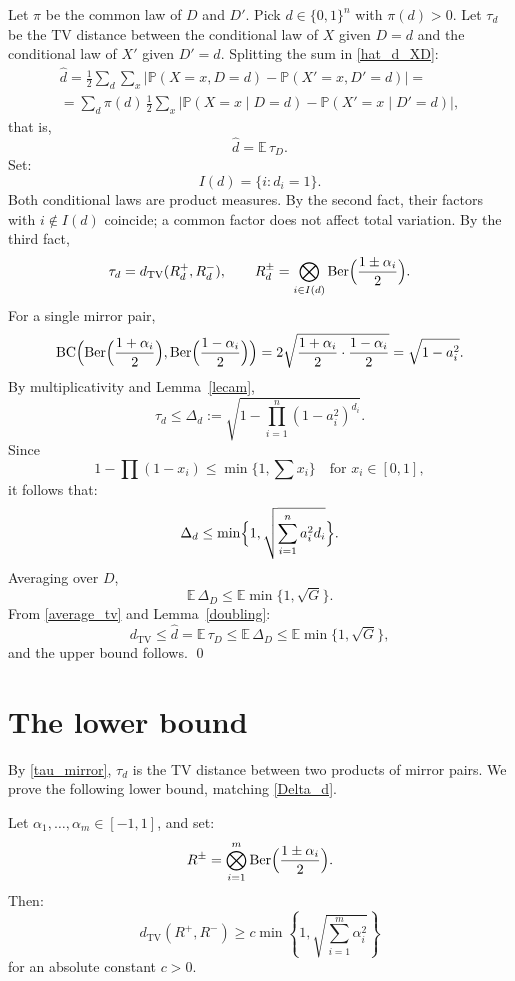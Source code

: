 \documentclass[12pt,reqno]{amsart}
\numberwithin{equation}{section}
\begin{document}
Let \(\pi\) be the common law of \(D\) and \(D'\). 
Pick \(d\in\{0,1\}^n\) with \(\pi(d)>0\). 
Let \(\tau_d\) be the TV distance
between the conditional law of \(X\) given \(D=d\) and the conditional law
of \(X'\) given \(D'=d\). Splitting the sum in \eqref{hat_d_XD}:
\begin{multline*}
\widehat d
=
\frac12\sum_d\sum_x
\bigl|\mathbb P(X=x,D=d)-\mathbb P(X'=x,D'=d)\bigr|
= \\ 
= \sum_d\pi(d)\,
\frac12\sum_x
\bigl|\mathbb P(X=x\mid D=d)-\mathbb P(X'=x\mid D'=d)\bigr|,
\end{multline*}
that is,
\begin{equation}\label{average_tv}
\widehat d=\mathbb E\,\tau_D.
\end{equation}
Set:
\[
I(d)=\{i:d_i=1\}.
\]
Both conditional laws are product measures. By the second fact, their
factors with \(i\notin I(d)\) coincide; a common factor does not affect
total variation. By the third fact,
\begin{equation}\label{tau_mirror}
\tau_d
=
d_{\mathrm{TV}}(R_d^+,R_d^-),
\qquad
R_d^\pm
=
\bigotimes_{i\in I(d)}\mathrm{Ber}\Bigl(\frac{1\pm\alpha_i}2\Bigr).
\end{equation}
For a single mirror pair,
\[
\mathrm{BC}\Bigl(
\mathrm{Ber}\Bigl(\frac{1+\alpha_i}2\Bigr),
\mathrm{Ber}\Bigl(\frac{1-\alpha_i}2\Bigr)
\Bigr)
=
2\sqrt{\frac{1+\alpha_i}2\cdot\frac{1-\alpha_i}2}
=
\sqrt{1-a_i^2}.
\]
By multiplicativity and Lemma~\ref{lecam},
\begin{equation}\label{Delta_d}
\tau_d
\le
\Delta_d
:=
\sqrt{1-\prod_{i=1}^n(1-a_i^2)^{d_i}}.
\end{equation}
Since 
\[
1-\prod(1-x_i)\le\min\{1,\sum x_i\}\quad 
\text{for \(x_i\in[0,1]\)},
\]
it follows that:
\[
\Delta_d
\le
\min\Bigl\{1,\sqrt{\sum_{i=1}^na_i^2d_i}\Bigr\}.
\]
Averaging over \(D\),
\[
\mathbb E\,\Delta_D \le \mathbb E\min\{1,\sqrt G\}.
\]
From \eqref{average_tv} and Lemma~\ref{doubling}:
\begin{equation}\label{upper_chain}
d_{\mathrm{TV}}
\le
\widehat d
=
\mathbb E\,\tau_D
\le
\mathbb E\,\Delta_D
\le
\mathbb E\min\{1,\sqrt G\},
\end{equation}
and the upper bound follows. \qed

\section{The lower bound}\label{lower_bound}

By \eqref{tau_mirror}, \(\tau_d\) is the TV distance between two products of mirror pairs. We prove the following lower bound, matching \eqref{Delta_d}.
\begin{theorem}\label{dephasing_thm}
Let \(\alpha_1,\ldots,\alpha_m\in[-1,1]\), and set:
\[
R^\pm
=
\bigotimes_{i=1}^m\mathrm{Ber}\Bigl(\frac{1\pm\alpha_i}2\Bigr).
\]
Then:
\[
d_{\mathrm{TV}}(R^+,R^-)
\ge
c\min\left\{
1,
\sqrt{\sum_{i=1}^m\alpha_i^2}
\right\}
\]
for an absolute constant \(c>0\).
\end{theorem}
\end{document}
